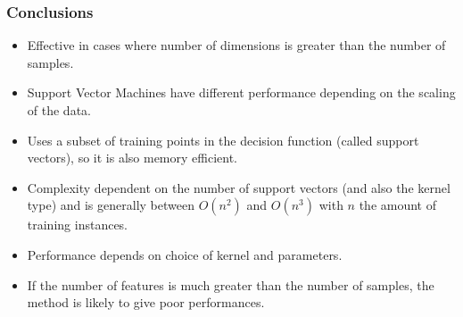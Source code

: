 \documentclass[proffesionalfonts]{beamer}
\begin{document}
\begin{frame}\frametitle{Conclusions}
  \begin{itemize}
  \item Effective in cases where number of dimensions is greater than the number of samples.
  \item Support Vector Machines have different performance depending on the scaling of the data.
  \item Uses a subset of training points in the decision function (called support vectors), so it is also memory efficient.
  \item Complexity dependent on the number of support vectors (and also the kernel type) and is generally between $O(n^2)$ and $O(n^3)$ with $n$ the amount of training instances.
  \item Performance depends on choice of kernel and parameters.
  \item If the number of features is much greater than the number of samples, the method is likely to give poor performances.
  \end{itemize}
\end{frame}
\end{document}
